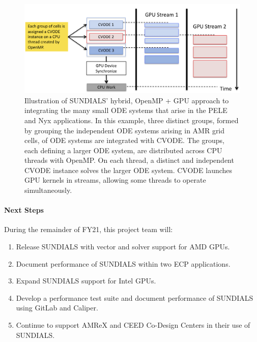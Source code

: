 \begin{figure}[htb]
	\centering
	\includegraphics[width=0.9\linewidth]{projects/2.3.3-MathLibs/2.3.3.12-SUNDIALS-hypre/AMReX_CVODE_OpenMP_GPU-Streams-2.png}
	\caption{\label{fig:sun-many-demo} Illustration of SUNDIALS' hybrid, OpenMP + GPU approach to integrating the many small ODE systems that arise in the PELE and Nyx applications.  In this example, three distinct groups, formed by grouping the independent ODE systems arising in AMR grid cells, of ODE systems are integrated with CVODE. The groups, each defining a larger ODE system, are distributed across CPU threads with OpenMP. On each thread, a distinct and independent CVODE instance solves the larger ODE system. CVODE launches GPU kernels in streams, allowing some threads to operate simultaneously.}
\end{figure}




\paragraph{Next Steps}

During the remainder of FY21, this project team will:
\begin{enumerate}
\item Release SUNDIALS with vector and solver support for AMD GPUs.
\item Document performance of SUNDIALS within two ECP applications.
\item Expand SUNDIALS support for Intel GPUs.
\item Develop a performance test suite and document performance of SUNDIALS using GitLab and Caliper.
\item Continue to support AMReX and CEED Co-Design Centers in their use of SUNDIALS.
\end{enumerate}
